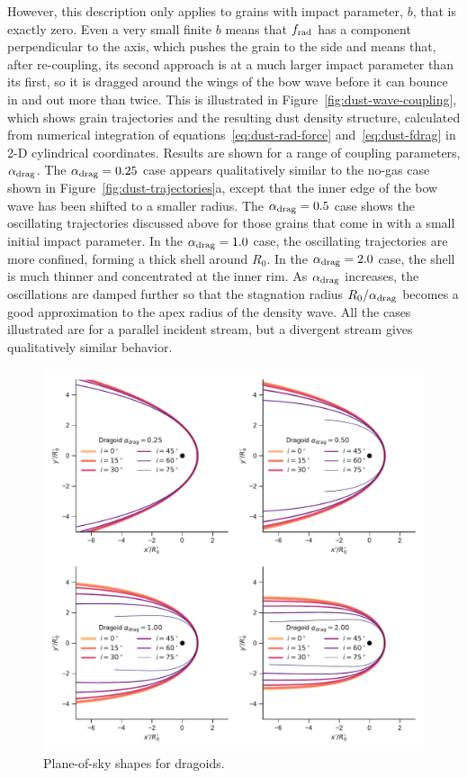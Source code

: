 However, this description only applies to grains with impact
parameter, \(b\), that is exactly zero.  Even a very small finite
\(b\) means that \(f_{\text{rad}}\) has a component perpendicular to the axis,
which pushes the grain to the side and means that, after re-coupling,
its second approach is at a much larger impact parameter than its
first, so it is dragged around the wings of the bow wave before it can
bounce in and out more than twice.  This is illustrated in
Figure~\ref{fig:dust-wave-coupling}, which shows grain trajectories
and the resulting dust density structure, calculated from numerical
integration of equations~\eqref{eq:dust-rad-force}
and~\eqref{eq:dust-fdrag} in 2-D cylindrical coordinates.  Results are
shown for a range of coupling parameters, \(\alpha_{\text{drag}}\).  The
\(\alpha_{\text{drag}} = 0.25\) case appears qualitatively similar to the no-gas
case shown in Figure~\ref{fig:dust-trajectories}a, except that the
inner edge of the bow wave has been shifted to a smaller radius.  The
\(\alpha_{\text{drag}} = 0.5\) case shows the oscillating trajectories discussed
above for those grains that come in with a small initial impact
parameter.  In the \(\alpha_{\text{drag}} = 1.0\) case, the oscillating trajectories
are more confined, forming a thick shell around \(R_0\).  In the
\(\alpha_{\text{drag}} = 2.0\) case, the shell is much thinner and concentrated at
the inner rim.  As \(\alpha_{\text{drag}}\) increases, the oscillations are damped
further so that the stagnation radius \(R_0 / \alpha_{\text{drag}}\) becomes a good
approximation to the apex radius of the density wave.  All the cases
illustrated are for a parallel incident stream, but a divergent stream
gives qualitatively similar behavior.


\begin{figure}
  \centering
  \includegraphics[width=\linewidth]{figs/test_xyprime_dragoid}
  \caption{Plane-of-sky shapes for dragoids.}
  \label{fig:dragoid-xy-prime}
\end{figure}


